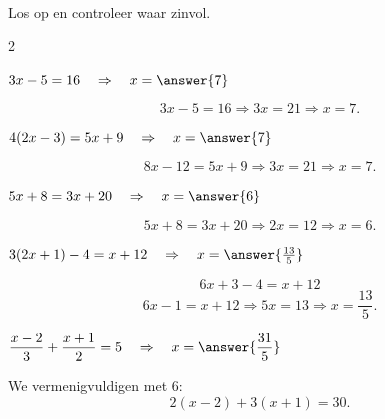 \documentclass{ximera}
\begin{document}



\begin{oefening}[Vergelijkingen]{\oefB\ESS}
\\

Los op en controleer waar zinvol.

\begin{multicols}{2}

\begin{question}
$3x-5=16\quad\Rightarrow\quad x=\answer{7}$

\begin{oplossing}
\[
3x-5=16
\Rightarrow3x=21
\Rightarrow x=7.
\]
\end{oplossing}
\end{question}


\begin{question}
$4(2x-3)=5x+9\quad\Rightarrow\quad x=\answer{7}$

\begin{oplossing}
\[
8x-12=5x+9
\Rightarrow3x=21
\Rightarrow x=7.
\]
\end{oplossing}
\end{question}


\begin{question}
$5x+8=3x+20\quad\Rightarrow\quad x=\answer{6}$

\begin{oplossing}
\[
5x+8=3x+20
\Rightarrow2x=12
\Rightarrow x=6.
\]
\end{oplossing}
\end{question}


\begin{question}
$3(2x+1)-4=x+12\quad\Rightarrow\quad x=\answer{\frac{13}{5}}$

\begin{oplossing}
\[
6x+3-4=x+12
\]
\[
6x-1=x+12
\Rightarrow5x=13
\Rightarrow x=\frac{13}{5}.
\]
\end{oplossing}
\end{question}


\begin{question}
$\dfrac{x-2}{3}+\dfrac{x+1}{2}=5
\quad\Rightarrow\quad
x=\answer{\dfrac{31}{5}}$

\begin{oplossing}
We vermenigvuldigen met $6$:
\[
2(x-2)+3(x+1)=30.
\]


\end{oplossing}
\end{question}
\end{multicols}
\end{oefening}
\end{document}
